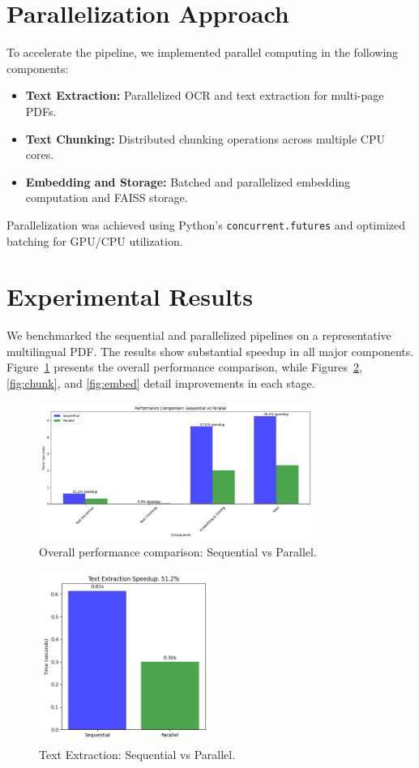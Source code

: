 \documentclass[11pt,a4paper]{article}
\begin{document}
\section{Parallelization Approach}
To accelerate the pipeline, we implemented parallel computing in the following components:
\begin{itemize}
    \item \textbf{Text Extraction:} Parallelized OCR and text extraction for multi-page PDFs.
    \item \textbf{Text Chunking:} Distributed chunking operations across multiple CPU cores.
    \item \textbf{Embedding and Storage:} Batched and parallelized embedding computation and FAISS storage.
\end{itemize}
Parallelization was achieved using Python's \texttt{concurrent.futures} and optimized batching for GPU/CPU utilization.

\section{Experimental Results}
We benchmarked the sequential and parallelized pipelines on a representative multilingual PDF. The results show substantial speedup in all major components. Figure~\ref{fig:overall} presents the overall performance comparison, while Figures~\ref{fig:extract}, \ref{fig:chunk}, and \ref{fig:embed} detail improvements in each stage.

\begin{figure}[h]
    \centering
    \includegraphics[width=0.8\textwidth]{performance_comparison.png}
    \caption{Overall performance comparison: Sequential vs Parallel.}
    \label{fig:overall}
\end{figure}

\begin{figure}[h]
    \centering
    \includegraphics[width=0.5\textwidth]{benchmark_text_extraction.png}
    \caption{Text Extraction: Sequential vs Parallel.}
    \label{fig:extract}
\end{figure}
\end{document}
